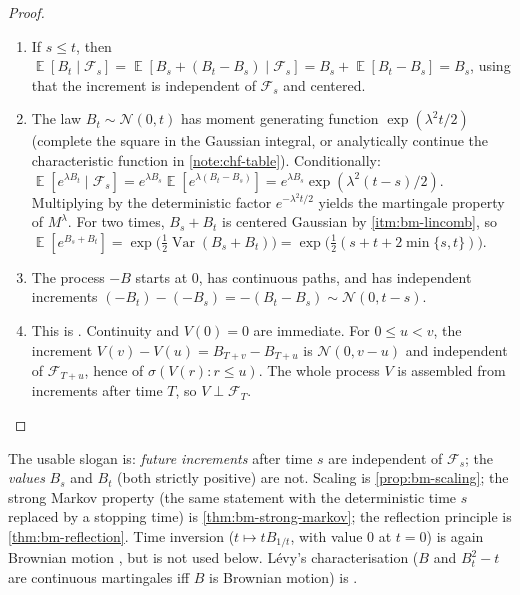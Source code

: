 \documentclass[11pt,a4paper]{article}
\DeclareMathOperator{\Var}{Var}
\DeclareMathOperator{\E}{\mathbb{E}}
\begin{document}
\begin{proof}
\begin{enumerate}[label=\textup{(\roman*)}]
and \(s=\min\{s,t\}\). Taking \(a=b=1\) gives \(B_s+B_t\sim\mathcal{N}(0,s+t+2\min\{s,t\})\); if \(s\le t\) this is \(t+3s\).
    \item
    If \(s\le t\), then \(\E[B_t\mid\mathcal{F}_s]=\E[B_s+(B_t-B_s)\mid\mathcal{F}_s]=B_s+\E[B_t-B_s]=B_s\), using that the increment is independent of \(\mathcal{F}_s\) and centered.
    \item
    The law \(B_t\sim\mathcal{N}(0,t)\) has moment generating function \(\exp(\lambda^2 t/2)\) (complete the square in the Gaussian integral, or analytically continue the characteristic function in \cref{note:chf-table}). Conditionally: \(\E[e^{\lambda B_t}\mid\mathcal{F}_s]=e^{\lambda B_s}\E[e^{\lambda(B_t-B_s)}]=e^{\lambda B_s}\exp(\lambda^2(t-s)/2)\). Multiplying by the deterministic factor \(e^{-\lambda^2 t/2}\) yields the martingale property of \(M^\lambda\). For two times, \(B_s+B_t\) is centered Gaussian by \ref{itm:bm-lincomb}, so \(\E[e^{B_s+B_t}]=\exp\bigl(\tfrac12\Var(B_s+B_t)\bigr)=\exp\bigl(\tfrac12(s+t+2\min\{s,t\})\bigr)\).
    \item
    The process \(-B\) starts at \(0\), has continuous paths, and has independent increments \((-B_t)-(-B_s)=-(B_t-B_s)\sim\mathcal{N}(0,t-s)\).
    \item
    This is \citep[Exercise~6.27]{brzezniak1999}. Continuity and \(V(0)=0\) are immediate. For \(0\le u<v\), the increment \(V(v)-V(u)=B_{T+v}-B_{T+u}\) is \(\mathcal{N}(0,v-u)\) and independent of \(\mathcal{F}_{T+u}\), hence of \(\sigma(V(r):r\le u)\). The whole process \(V\) is assembled from increments after time \(T\), so \(V\perp\mathcal{F}_T\).
\end{enumerate}
\end{proof}

\begin{remark}
\label{rem:bm-indep-slogan}
The usable slogan is: \emph{future increments} after time \(s\) are independent of \(\mathcal{F}_{s}\); the \emph{values} \(B_{s}\) and \(B_{t}\) (both strictly positive) are not. Scaling is \cref{prop:bm-scaling}; the strong Markov property (the same statement with the deterministic time \(s\) replaced by a stopping time) is \cref{thm:bm-strong-markov}; the reflection principle is \cref{thm:bm-reflection}. Time inversion (\(t\mapsto t B_{1/t}\), with value \(0\) at \(t=0\)) is again Brownian motion \citep[Chapter~8]{durrett2010}, but is not used below. Lévy's characterisation (\(B\) and \(B_{t}^{2}-t\) are continuous martingales iff \(B\) is Brownian motion) is \citep[Theorem~6.4]{brzezniak1999}.
\end{remark}
\end{document}
